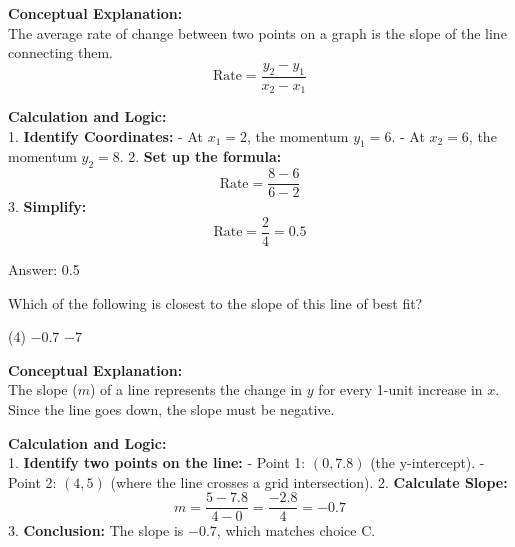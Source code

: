 \documentclass[11pt,paper=a4,answers]{exam}
\begin{document}
\begin{questions}
\begin{solution}
\textbf{Conceptual Explanation:} \\
The average rate of change between two points on a graph is the slope of the line connecting them. 
\[ \text{Rate} = \frac{y_2 - y_1}{x_2 - x_1} \]

\vspace{30pt}

\textbf{Calculation and Logic:} \\
1. \textbf{Identify Coordinates:}
   - At $x_1 = 2$, the momentum $y_1 = 6$.
   - At $x_2 = 6$, the momentum $y_2 = 8$.
2. \textbf{Set up the formula:} 
\[ \text{Rate} = \frac{8 - 6}{6 - 2} \]
3. \textbf{Simplify:}
\[ \text{Rate} = \frac{2}{4} = 0.5 \]

\vspace{30pt}

Answer: \colorbox{yellow!100}{0.5}
\end{solution}

\vspace{60pt}

\question
\begin{center}
\end{center}
Which of the following is closest to the slope of this line of best fit?
\begin{tasks}(4)
    \task $-0.7$
    \task $-7$
\end{tasks}

\begin{solution}
\textbf{Conceptual Explanation:} \\
The slope ($m$) of a line represents the change in $y$ for every 1-unit increase in $x$. Since the line goes down, the slope must be negative.

\vspace{30pt}

\textbf{Calculation and Logic:} \\
1. \textbf{Identify two points on the line:} 
   - Point 1: $(0, 7.8)$ (the y-intercept).
   - Point 2: $(4, 5)$ (where the line crosses a grid intersection).
2. \textbf{Calculate Slope:} 
\[ m = \frac{5 - 7.8}{4 - 0} = \frac{-2.8}{4} = -0.7 \]
3. \textbf{Conclusion:} The slope is $-0.7$, which matches choice C.


\end{solution}
\end{questions}
\end{document}
